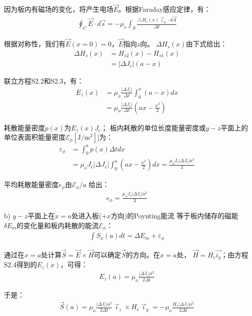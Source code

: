 因为板内有磁场的变化，将产生电场$\vec{E}$。根据Faraday感应定律，有：
\begin{align*}%
\oint_{C}\vec{E}\cdot d\vec{s}=-\mu_{o}\int_{S}\frac{\triangle H_{s}(x)\vec{\imath}_{y}\cdot d\vec{A}}{\Delta t} \tag{S2.2}
\end{align*}

根据对称性，我们有$\vec{E}(x = 0) = 0$，$\vec{E}$指向$z$向。
$\Delta H_s(x)$由下式给出：
\begin{align*}%
\Delta H_{s}(x)&=H_{s2}(x)-H_{s1}(x)\\
&=|\Delta J_{c}|(a-x)\tag{S2.3}
\end{align*}

联立方程S2.2和S2.3，有：
\begin{align*}%
E_{z}(x)&=\mu_{o}\frac{|\Delta J_{c}|}{\Delta t}\int_{0}^{x}(a-x)dx\\
&=\mu_{o}\frac{|\Delta J_{c}|}{\Delta t}(ax-\frac{x^{2}}{2})\tag{S2.4}
\end{align*}

耗散能量密度$p(x)$为$E_z(x)J_c$；
板内耗散的单位长度能量密度或$y-z$平面上的单位表面积能量密度$\mathcal{E}_\phi[\mathrm{J/m^2}]$]为：
\begin{align*}%
\varepsilon_{\phi}&=\int_{0}^{a}p(x)\Delta tdx\\
&=\mu_{o}J_{c}|\Delta J_{c}|\int_{0}^{a}(ax-\frac{x^{2}}{2})dx=\frac{\mu_{o}J_{c}|\Delta J_{c}|a^{3}}{3}\tag{S2.5}
\end{align*}

平均耗散能量密度$e_\phi$由$\mathcal{E}_\phi/a$ 给出：
\begin{align*}%
e_{\phi}=\frac{\mu_{o}J_{c}|\Delta J_{c}|a^{2}}{3}\tag{5.37}
\end{align*}

b) $y-z$平面上在$x=a$处进入板($+x$方向)的Poynting能流
等于板内储存的磁能$\delta E_m$的变化量和板内耗散的能流$\mathcal{E}_\phi$： 
\begin{align*}%
\int S_{x}(a)dt=\Delta E_{m}+\varepsilon_{\phi}\tag{S2.6}
\end{align*}

通过在$x=a$处计算$\vec{S}=\vec{E}\times\vec{H}$可以确定$\vec{S}$的方向。在$x=a$处，
$\vec{H}=H_e \vec{i_y}$；由方程S2.4得到的$E_z(x)$，可得：
\begin{align*}%
E_{z}(a)=\mu_{o}\frac{|\Delta J_{c}|a^{2}}{2\Delta t}\tag{S2.7}
\end{align*}

于是：
\begin{align*}%
\vec{S}(a)=\mu_{o}\frac{|\Delta J_{c}|a^{2}}{2\Delta t}\vec{\imath}_{z}\times H_{e}\vec{\imath}_{y}=-\mu_{o}\frac{H_{e}|\Delta J_{c}|a^{2}}{2\Delta t}\tag{S2.8}
\end{align*}

